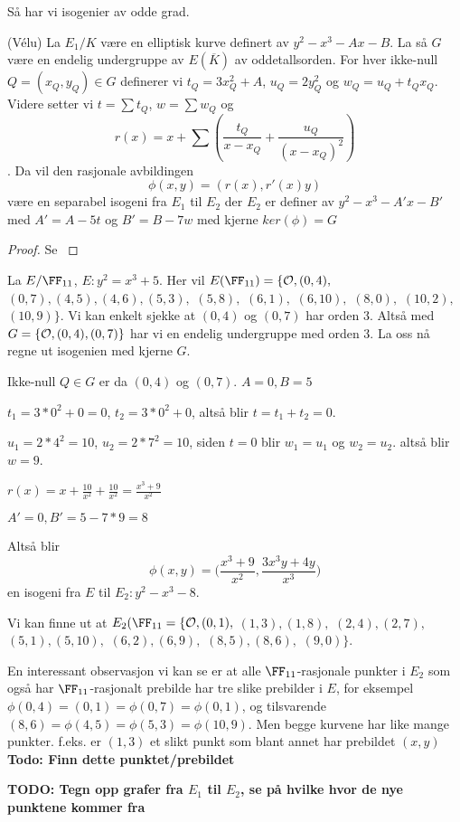 Så har vi isogenier av odde grad. 
\begin{teorem}
(Vélu) \cite{velu} La $E_1/K$ være en elliptisk kurve definert av  $y^2 - x^3 - Ax - B$. La så $G$ være en endelig undergruppe av $E(\overline{K})$ av oddetallsorden. For hver ikke-null $Q = (x_Q, y_Q) \in G$ definerer vi $t_Q = 3x_Q^2 + A$, $u_Q = 2y_Q^2$ og $w_Q = u_Q + t_Qx_Q$. Videre setter vi $t = \sum t_Q$, $w = \sum w_Q$ og $$r(x) = x + \sum (\frac{t_Q}{x - x_Q} + \frac{u_Q}{(x - x_Q)^2})$$. Da vil den rasjonale avbildingen $$ \phi(x,y) = (r(x), r'(x)y)$$ være en separabel isogeni fra $E_1$ til $E_2$ der $E_2$ er definer av $y^2 - x^3 - A'x - B' $ med $A' = A - 5t$ og $B' = B - 7w$ med kjerne $ker(\phi) = G$

\begin{proof}
Se \cite[6.14]{sutherland-notes}
\end{proof}
\end{teorem}



\begin{eksempel}
La $E/\FF_{11}$, $E: y^2 = x^3 + 5$. Her vil $E(\FF_{11})= \{\OO, (0,4),$ $(0,7), (4,5), (4,6), (5,3),$ $(5,8),$ $(6,1),$ $(6,10),$ $(8,0),$ $(10,2),$ $(10,9) \}$. Vi kan enkelt sjekke at $(0,4)$ og $(0,7)$ har orden $3$. Altså med $G = \{\mathcal{O}, (0,4), (0,7)\}$ har vi en endelig undergruppe med orden $3$. La oss nå regne ut isogenien med kjerne $G$.

Ikke-null $Q \in G$ er da $(0,4)$ og $(0,7)$. $A = 0, B = 5$

$t_1 = 3*0^2 + 0 = 0$, $t_2 = 3*0^2 + 0$, altså blir $t = t_1 + t_2 = 0$.

$u_1 = 2*4^2 = 10$, $u_2 = 2*7^2 = 10$, siden $t = 0$ blir $w_1 = u_1$ og $w_2 = u_2$. altså blir $w = 9$.

$r(x) = x + \frac{10}{x^2} + \frac{10}{x^2} = \frac{x^3 + 9}{x^2}$

$A' = 0, B' = 5 - 7*9 = 8$

Altså blir $$\phi(x,y) = \Big(\frac{x^3 + 9}{x^2}, \frac{3x^3y + 4y}{x^3}\Big)$$ en isogeni fra $E$ til $E_2: y^2 - x^3 - 8$. 

Vi kan finne ut at $E_2(\FF_{11} = \{\OO, (0,1),$ $(1,3), (1,8),$ $(2,4), (2,7),$ $(5,1), (5,10),$ $(6,2), (6,9),$ $(8,5), (8,6),$ $(9,0)\}$. 

En interessant observasjon vi kan se er at alle $\FF_{11}$-rasjonale punkter i $E_2$ som også har $\FF_{11}$-rasjonalt prebilde har tre slike prebilder i $E$, for eksempel $\phi(0,4) = (0,1) = \phi(0,7) = \phi(0, 1)$, og tilsvarende $(8,6) = \phi(4,5) = \phi(5,3) = \phi(10,9)$. Men begge kurvene har like mange punkter. f.eks. er $(1,3)$ et slikt punkt som blant annet har prebildet $(x,y)$\textbf{Todo: Finn dette punktet/prebildet}



\textbf{TODO: Tegn opp grafer fra $E_1$ til $E_2$, se på hvilke hvor de nye punktene kommer fra}

\end{eksempel}

